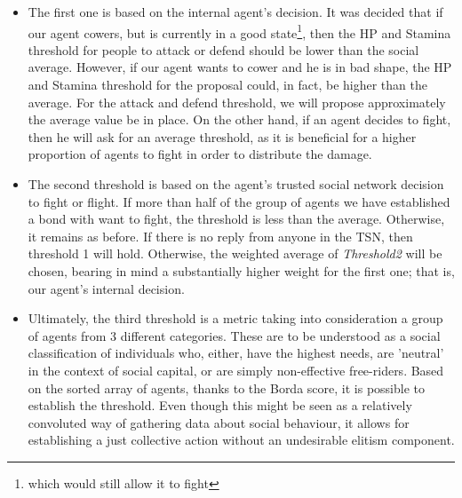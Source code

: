     \begin{itemize}
    \item The first one is based on the internal agent's decision. 
    It was decided that if our agent cowers, but is currently in a good state\footnote{which would still allow it to fight}, then the HP and Stamina threshold for people to attack or defend should be lower than the social average. However, if our agent wants to cower and he is in bad shape, the HP and Stamina threshold for the proposal could, in fact, be higher than the average. For the attack and defend threshold, we will propose approximately the average value be in place.
    On the other hand, if an agent decides to fight, then he will ask for an average threshold, as it is beneficial for a higher proportion of agents to fight in order to distribute the damage.

    \item The second threshold is based on the agent's trusted social network decision to fight or flight. If more than half of the group of agents we have established a bond with want to fight, the threshold is less than the average. Otherwise, it remains as before. If there is no reply from anyone in the TSN, then threshold 1 will hold. Otherwise, the weighted average of \textit{Threshold2} will be chosen, bearing in mind a substantially higher weight for the first one; that is, our agent's internal decision.
    
    \item Ultimately, the third threshold is a metric taking into consideration a group of agents from 3 different categories. These are to be understood as a social classification of individuals who, either, have the highest needs, are 'neutral' in the context of social capital, or are simply non-effective free-riders. 
    Based on the sorted array of agents, thanks to the Borda score, it is possible to establish the threshold. Even though this might be seen as a relatively convoluted way of gathering data about social behaviour, it allows for establishing a just collective action without an undesirable elitism component.
    \end{itemize}

\clearpage


